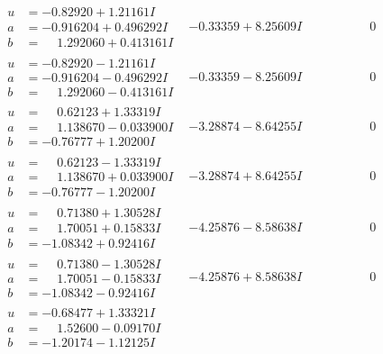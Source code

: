 \documentclass[1p]{elsarticle_modified}
\theoremstyle{definition}
\begin{document}
$$\begin{array}{c|c|c}
 \hline 
\begin{aligned}
u &= -0.82920 + 1.21161 I \\
a &= -0.916204 + 0.496292 I \\
b &= \phantom{-}1.292060 + 0.413161 I\end{aligned}
 & -0.33359 + 8.25609 I & \phantom{-0.000000 } 0 \\ \hline\begin{aligned}
u &= -0.82920 - 1.21161 I \\
a &= -0.916204 - 0.496292 I \\
b &= \phantom{-}1.292060 - 0.413161 I\end{aligned}
 & -0.33359 - 8.25609 I & \phantom{-0.000000 } 0 \\ \hline\begin{aligned}
u &= \phantom{-}0.62123 + 1.33319 I \\
a &= \phantom{-}1.138670 - 0.033900 I \\
b &= -0.76777 + 1.20200 I\end{aligned}
 & -3.28874 - 8.64255 I & \phantom{-0.000000 } 0 \\ \hline\begin{aligned}
u &= \phantom{-}0.62123 - 1.33319 I \\
a &= \phantom{-}1.138670 + 0.033900 I \\
b &= -0.76777 - 1.20200 I\end{aligned}
 & -3.28874 + 8.64255 I & \phantom{-0.000000 } 0 \\ \hline\begin{aligned}
u &= \phantom{-}0.71380 + 1.30528 I \\
a &= \phantom{-}1.70051 + 0.15833 I \\
b &= -1.08342 + 0.92416 I\end{aligned}
 & -4.25876 - 8.58638 I & \phantom{-0.000000 } 0 \\ \hline\begin{aligned}
u &= \phantom{-}0.71380 - 1.30528 I \\
a &= \phantom{-}1.70051 - 0.15833 I \\
b &= -1.08342 - 0.92416 I\end{aligned}
 & -4.25876 + 8.58638 I & \phantom{-0.000000 } 0 \\ \hline\begin{aligned}
u &= -0.68477 + 1.33321 I \\
a &= \phantom{-}1.52600 - 0.09170 I \\
b &= -1.20174 - 1.12125 I\end{aligned}

\end{array}$$
\end{document}
